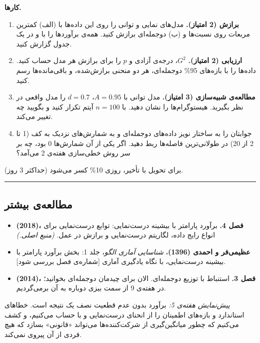 \textbf{کارها.}

\begin{enumerate}
\def\labelenumi{\arabic{enumi}.}
\tightlist
\item
  \textbf{برازش (2 امتیاز).} مدل‌های نمایی و توانی را روی این داده‌ها با
  (الف) کمترین مربعات روی نسبت‌ها و (ب)  دوجمله‌ای برازش کنید.
  همه‌ی برآوردها را با  و  در یک جدول گزارش کنید.
\item
  \textbf{ارزیابی (2 امتیاز).} \(G^2\)، درجه‌ی آزادی و \(p\) را برای
  برازش  هر مدل حساب کنید. داده‌ها را با بازه‌های 95\% دوجمله‌ای،
  هر دو منحنی برازش‌شده، و باقی‌مانده‌ها رسم کنید.
\item
  \textbf{مطالعه‌ی شبیه‌سازی (3 امتیاز).} مدل توانی با \(A = 0.95\)،
  \(d = 0.7\) را مدل واقعی در نظر بگیرید. هیستوگرام‌ها را نشان دهید. با
  \(n = 100\) آیتم تکرار کنید و بگویید چه تغییر می‌کند.
\item
  جوابتان را به ساختار نویز داده‌های دوجمله‌ای و به شمارش‌های نزدیک به کف
  (1 تا 2 از 20) در طولانی‌ترین فاصله‌ها ربط دهید. اگر یکی از آن شمارش‌ها 0
  بود، چه بر سر روش خطی‌سازی هفته‌ی 2 می‌آمد؟
\end{enumerate}

برای تحویل با تأخیر، روزی 10\% کسر می‌شود (حداکثر 3 روز).

\begin{center}\rule{0.5\linewidth}{0.5pt}\end{center}

\subsection{مطالعه‌ی بیشتر}

\begin{itemize}
\tightlist
\item
  \textbf{ \lr{\&}  (2018)، فصل 4.} برآورد
  پارامتر با بیشینه درست‌نمایی: توابع درست‌نمایی برای انواع رایج داده،
  لگاریتم درست‌نمایی و برازش در عمل. \emph{(منبع اصلی.)}
\item
  \textbf{عظیمی‌فر و احمدی (1396)}، \emph{شناسایی آماری الگو}، جلد 1: بخش
  برآورد پارامتر با بیشینه درست‌نمایی، با نگاه یادگیری آماری {[}شماره‌ی
  فصل بررسی شود{]}.
\item
  \textbf{ \lr{\&}  (2014)، فصل 3.} استنباط با توزیع
  دوجمله‌ای. الان برای چیدمان دوجمله‌ای بخوانید؛ در هفته‌ی 9 از سمت بیزی
  دوباره به آن برمی‌گردیم.
\end{itemize}

\emph{پیش‌نمایش هفته‌ی 5:} برآورد بدون عدم قطعیت نصف یک نتیجه است. خطاهای
استاندارد و بازه‌های اطمینان را از انحنای درست‌نمایی و با 
حساب می‌کنیم، و کشف می‌کنیم که چطور میانگین‌گیری از شرکت‌کننده‌ها می‌تواند
«قانونی» بسازد که هیچ فردی از آن پیروی نمی‌کند.
